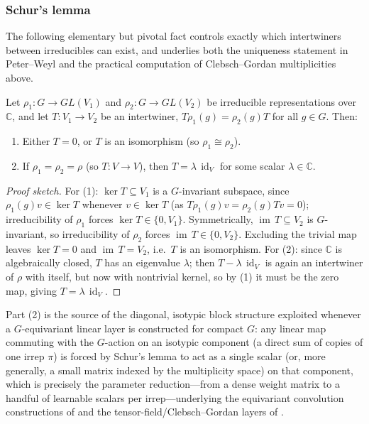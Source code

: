 \documentclass[mathematics,review,submit,moreauthors]{Definitions/mdpi}
\begin{document}
\subsubsection{Schur's lemma}
\label{subsubsec:schurs-lemma}

The following elementary but pivotal fact controls exactly which
intertwiners between irreducibles can exist, and underlies both the
uniqueness statement in Peter--Weyl and the practical computation of
Clebsch--Gordan multiplicities above.

\begin{Lemma}[Schur]
\label{lem:schur}
Let $\rho_1 : G \to GL(V_1)$ and $\rho_2 : G \to GL(V_2)$ be irreducible
representations over $\mathbb{C}$, and let $T : V_1 \to V_2$ be an
intertwiner, $T\rho_1(g) = \rho_2(g) T$ for all $g \in G$. Then:
\begin{enumerate}
    \item Either $T = 0$, or $T$ is an isomorphism (so $\rho_1 \cong \rho_2$).
    \item If $\rho_1 = \rho_2 = \rho$ (so $T : V \to V$), then
    $T = \lambda\, \operatorname{id}_V$ for some scalar $\lambda \in \mathbb{C}$.
\end{enumerate}
\end{Lemma}

\begin{proof}[Proof sketch]
For (1): $\ker T \subseteq V_1$ is a $G$-invariant subspace, since
$\rho_1(g)v \in \ker T$ whenever $v \in \ker T$ (as $T\rho_1(g)v =
\rho_2(g)Tv = 0$); irreducibility of $\rho_1$ forces $\ker T \in \{0, V_1\}$.
Symmetrically, $\operatorname{im}\, T \subseteq V_2$ is $G$-invariant, so
irreducibility of $\rho_2$ forces $\operatorname{im}\, T \in \{0, V_2\}$. Excluding
the trivial map leaves $\ker T = 0$ and $\operatorname{im}\, T = V_2$, i.e.\ $T$ is
an isomorphism. For (2): since $\mathbb{C}$ is algebraically closed, $T$ has
an eigenvalue $\lambda$; then $T - \lambda\,\operatorname{id}_V$ is again an
intertwiner of $\rho$ with itself, but now with nontrivial kernel, so by (1)
it must be the zero map, giving $T = \lambda\,\operatorname{id}_V$.
\end{proof}

Part (2) is the source of the diagonal, isotypic block structure exploited
whenever a $G$-equivariant linear layer is constructed for compact $G$: any
linear map commuting with the $G$-action on an isotypic component (a direct
sum of copies of one irrep $\pi$) is forced by Schur's lemma to act as a
single scalar (or, more generally, a small matrix indexed by the
multiplicity space) on that component, which is precisely the parameter
reduction---from a dense weight matrix to a handful of learnable
scalars per irrep---underlying the equivariant convolution constructions of
\citep{cohen2014} and the tensor-field/Clebsch--Gordan layers of
\citep{kondor2018p3icml}.
\end{document}
